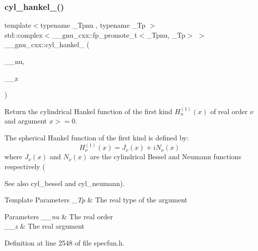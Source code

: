 \subsubsection{\texorpdfstring{cyl\+\_\+hankel\+\_()}{cyl\_hankel\_1()}\hspace{0.1cm}{\footnotesize\ttfamily [1/2]}}
{\footnotesize\ttfamily template$<$typename \+\_\+\+Tpnu , typename \+\_\+\+Tp $>$ \\
std\+::complex$<$\+\_\+\+\_\+gnu\+\_\+cxx\+::fp\+\_\+promote\+\_\+t$<$\+\_\+\+Tpnu, \+\_\+\+Tp$>$ $>$ \+\_\+\+\_\+gnu\+\_\+cxx\+::cyl\+\_\+hankel\+\_ (\begin{DoxyParamCaption}\item[{\+\_\+\+Tpnu}]{\+\_\+\+\_\+nu,  }\item[{\+\_\+\+Tp}]{\+\_\+\+\_\+z }\end{DoxyParamCaption})\hspace{0.3cm}{\ttfamily [inline]}}

Return the cylindrical Hankel function of the first kind $ H^{(1)}_n(x) $ of real order $ \nu $ and argument $ x >= 0 $.

The spherical Hankel function of the first kind is defined by\+: \[ H^{(1)}_\nu(x) = J_\nu(x) + iN_\nu(x) \] where $ J_\nu(x) $ and $ N_\nu(x) $ are the cylindrical Bessel and Neumann functions respectively (\begin{DoxySeeAlso}{See also}
cyl\+\_\+bessel and cyl\+\_\+neumann).
\end{DoxySeeAlso}

\begin{DoxyTemplParams}{Template Parameters}
{\em \+\_\+\+Tp} & The real type of the argument \\
\hline
\end{DoxyTemplParams}

\begin{DoxyParams}{Parameters}
{\em \+\_\+\+\_\+nu} & The real order \\
\hline
{\em \+\_\+\+\_\+z} & The real argument \\
\hline
\end{DoxyParams}


Definition at line 2548 of file specfun.\+h.

\mbox{\label{group__gnu__math__spec__func_ga2f111212d3ec713625acb6986daa925f}} 
